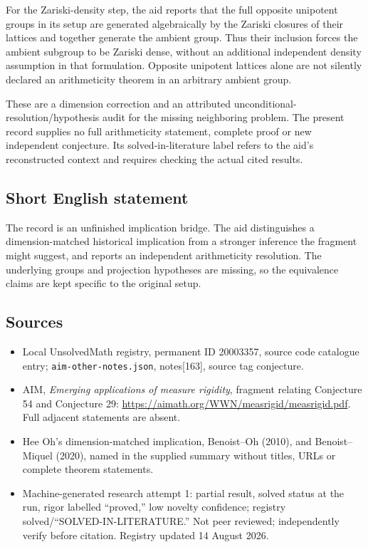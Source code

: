 \documentclass[11pt]{article}
\begin{document}
For the Zariski-density step, the aid reports that the full opposite unipotent groups in its setup are generated algebraically by the Zariski closures of their lattices and together generate the ambient group. Thus their inclusion forces the ambient subgroup to be Zariski dense, without an additional independent density assumption in that formulation. Opposite unipotent lattices alone are not silently declared an arithmeticity theorem in an arbitrary ambient group.

These are a dimension correction and an attributed unconditional-resolution/hypothesis audit for the missing neighboring problem. The present record supplies no full arithmeticity statement, complete proof or new independent conjecture. Its solved-in-literature label refers to the aid's reconstructed context and requires checking the actual cited results.
\subsection{Short English statement}
The record is an unfinished implication bridge. The aid distinguishes a dimension-matched historical implication from a stronger inference the fragment might suggest, and reports an independent arithmeticity resolution. The underlying groups and projection hypotheses are missing, so the equivalence claims are kept specific to the original setup.
\subsection{Sources}
\begin{itemize}
\item Local UnsolvedMath registry, permanent ID 20003357, source code catalogue entry; \texttt{aim-other-notes.json}, notes[163], source tag conjecture.
\item AIM, \emph{Emerging applications of measure rigidity}, fragment relating Conjecture 54 and Conjecture 29: \url{https://aimath.org/WWN/measrigid/measrigid.pdf}. Full adjacent statements are absent.
\item Hee Oh's dimension-matched implication, Benoist--Oh (2010), and Benoist--Miquel (2020), named in the supplied summary without titles, URLs or complete theorem statements.
\item Machine-generated research attempt 1: partial result, solved status at the run, rigor labelled ``proved,'' low novelty confidence; registry solved/``SOLVED-IN-LITERATURE.'' Not peer reviewed; independently verify before citation. Registry updated 14 August 2026.
\end{itemize}
\end{document}
